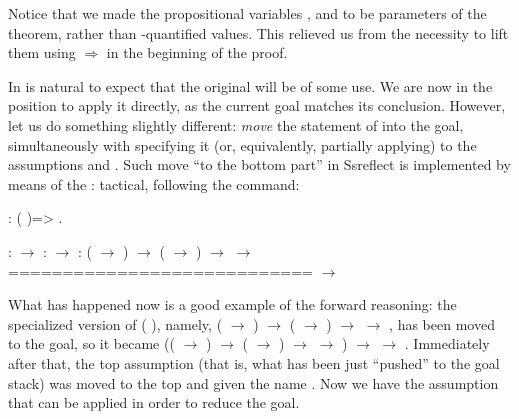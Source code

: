 Notice that we made the propositional variables ,  and  to be
parameters of the theorem, rather than \coqdockw{\ensuremath{\forall}}-quantified
values. This relieved us from the necessity to lift them using
\ensuremath{\Rightarrow} in the beginning of the proof.


In is natural to expect that the original  will be of some
use. We are now in the position to apply it directly, as the current
goal matches its conclusion. However, let us do something slightly
different: \textit{move} the statement of  into the goal,
simultaneously with specifying it (or, equivalently, partially
applying) to the assumptions  and . Such move ``to the bottom
part'' in Ssreflect is implemented by means of the \ssrtl{:} :
tactical, following the  command:


\begin{coqdoccode}
\coqdocemptyline
\coqdocnoindent
{}: (   )=> .\coqdoceol
\end{coqdoccode}


\coqdoceol
\coqdocemptyline
\coqdocindent{1.00em}
 :  \ensuremath{\rightarrow} \coqdoceol
\coqdocindent{1.00em}
 :  \ensuremath{\rightarrow} \coqdoceol
\coqdocindent{1.00em}
 : ( \ensuremath{\rightarrow} ) \ensuremath{\rightarrow} ( \ensuremath{\rightarrow} ) \ensuremath{\rightarrow}  \ensuremath{\rightarrow} \coqdoceol
\coqdocindent{1.00em}
============================\coqdoceol
\coqdocindent{1.50em}
 \ensuremath{\rightarrow} 

\coqdocemptyline


What has happened now is a good example of the forward reasoning: the
specialized version of (   ), namely, ( \ensuremath{\rightarrow} ) \ensuremath{\rightarrow} ( \ensuremath{\rightarrow}
) \ensuremath{\rightarrow}  \ensuremath{\rightarrow} , has been moved to the goal, so it became (( \ensuremath{\rightarrow} ) \ensuremath{\rightarrow}
( \ensuremath{\rightarrow} ) \ensuremath{\rightarrow}  \ensuremath{\rightarrow} ) \ensuremath{\rightarrow}  \ensuremath{\rightarrow} . Immediately after that, the top
assumption (that is, what has been just ``pushed'' to the goal stack)
was moved to the top and given the name . Now we have the
assumption  that can be applied in order to reduce the goal.  


